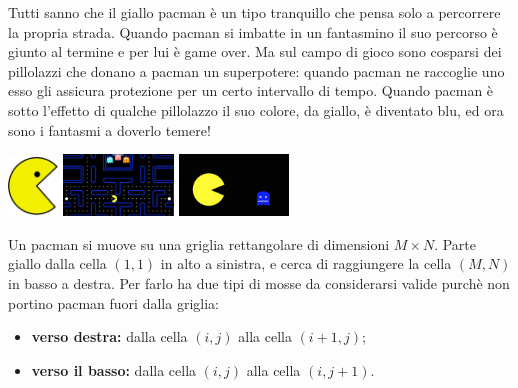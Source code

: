 \renewcommand{\nomebreve}{pacman\_best}
\renewcommand{\titolo}{Miglior percorso di un pacman}

\introduzione{}
\vspace{-1cm}

Tutti sanno che il giallo pacman è un tipo tranquillo che pensa solo a percorrere la propria strada. Quando pacman si imbatte in un fantasmino il suo percorso è giunto al termine e per lui è game over. Ma sul campo di gioco sono cosparsi dei pillolazzi che donano a pacman un superpotere: quando pacman ne raccoglie uno esso gli assicura protezione per un certo intervallo di tempo. Quando pacman è sotto l'effetto di qualche pillolazzo il suo colore, da giallo, è diventato blu, ed ora sono i fantasmi a doverlo temere!

\hspace{0.8cm}
\includegraphics[width=0.1\textwidth]{figures/pacman_big.png}
\hfill
\includegraphics[width=0.22\textwidth]{figures/pacman_field.jpeg}
\hfill
\includegraphics[width=0.22\textwidth]{figures/pacman_rage.png}

Un pacman si muove su una griglia rettangolare di dimensioni $M\times N$.
Parte giallo dalla cella $(1,1)$ in alto a sinistra, e cerca di raggiungere la cella $(M,N)$ in basso a destra.
Per farlo ha due tipi di mosse da considerarsi valide purch\`e non portino pacman fuori dalla griglia:
\begin{itemize}
   \item[] {\bf verso destra:} dalla cella $(i,j)$ alla cella $(i+1,j)$;
   \item[] {\bf verso il basso:} dalla cella $(i,j)$ alla cella $(i,j+1)$.
\end{itemize}

